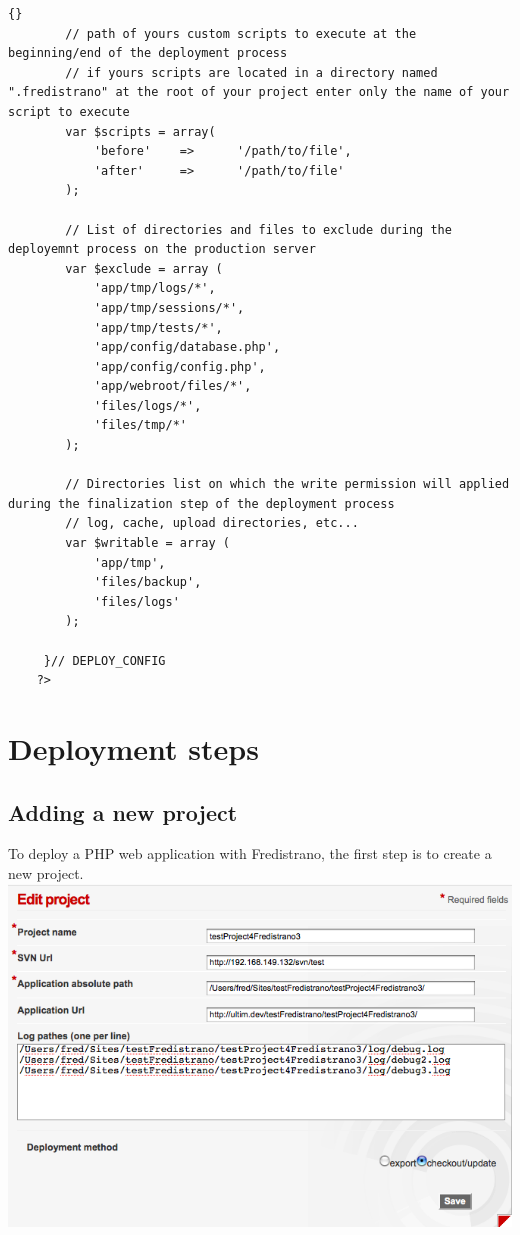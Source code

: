 \documentclass[12pt,a4paper]{report}
\begin{document}
\begin{itemize}
\begin{lstlisting}[frame=tb]{}
	 	// path of yours custom scripts to execute at the beginning/end of the deployment process
		// if yours scripts are located in a directory named ".fredistrano" at the root of your project enter only the name of your script to execute
	 	var $scripts = array(
	 		'before' 	=>		'/path/to/file', 
	 		'after' 	=>		'/path/to/file' 
	 	);

		// List of directories and files to exclude during the deployemnt process on the production server
		var $exclude = array (
			'app/tmp/logs/*',
			'app/tmp/sessions/*',
			'app/tmp/tests/*',
			'app/config/database.php',
			'app/config/config.php',
			'app/webroot/files/*',
			'files/logs/*',
			'files/tmp/*'
		);

		// Directories list on which the write permission will applied during the finalization step of the deployment process	
		// log, cache, upload directories, etc...
		var $writable = array (
			'app/tmp',
			'files/backup',
			'files/logs'
		);

	 }// DEPLOY_CONFIG
	?>
\end{lstlisting}

\end{itemize}
\newpage

\section{Deployment steps}

\subsection{Adding a new project}

To deploy a PHP web application with Fredistrano, the first step is to create a new project.\\

\includegraphics[width=1\textwidth]{doc_fredistrano1.png} 
\end{document}
